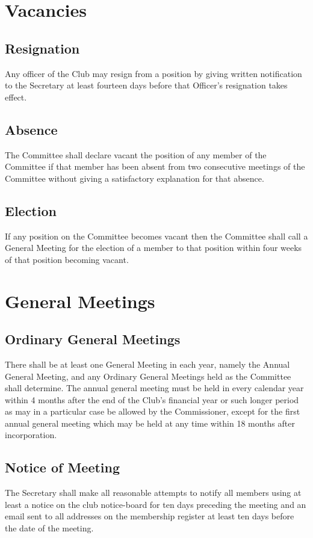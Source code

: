 \documentclass[11pt]{article} %
\begin{document}
\section{Vacancies}
\subsection{Resignation}
Any officer of the Club may resign from a position by giving written notification to the Secretary at least fourteen days before that Officer's resignation takes effect.
\subsection{Absence}
The Committee shall declare vacant the position of any member of the Committee if that member has been absent from two consecutive meetings of the Committee without giving a satisfactory explanation for that absence.
\subsection{Election}
If any position on the Committee becomes vacant then the Committee shall call a General Meeting for the election of a member to that position within four weeks of that position becoming vacant.

\section{General Meetings}
\subsection{Ordinary General Meetings}
There shall be at least one General Meeting in each year, namely the Annual General Meeting, and any Ordinary General Meetings held as the Committee shall determine. The annual general meeting must be held in every calendar year within 4 months after the end of the Club's financial year or such longer period as may in a particular case be allowed by the Commissioner, except for the first annual general meeting which may be held at any time within 18 months after incorporation.
\subsection{Notice of Meeting}
The Secretary shall make all reasonable attempts to notify all members using at least a notice on the club notice-board for ten days preceding the meeting and an email sent to all addresses on the membership register at least ten days before the date of the meeting.
\end{document}
